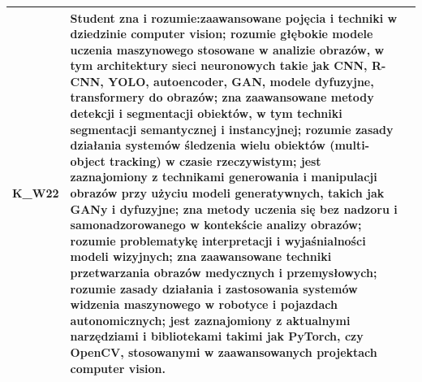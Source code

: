 \documentclass[12pt, a4paper]{article}
\begin{document}
{\begin{longtable}{m{1.6cm}m{9.0cm}m{4.2cm}}
  \rowcolor{tableRowLight} K\_W22 & Student zna i rozumie:zaawansowane pojęcia i techniki w dziedzinie computer vision; rozumie głębokie modele uczenia maszynowego stosowane w analizie obrazów, w tym architektury sieci neuronowych takie jak CNN, R-CNN, YOLO, autoencoder, GAN, modele dyfuzyjne, transformery do obrazów; zna zaawansowane metody detekcji i segmentacji obiektów, w tym techniki segmentacji semantycznej i instancyjnej; rozumie zasady działania systemów śledzenia wielu obiektów (multi-object tracking) w czasie rzeczywistym; jest zaznajomiony z technikami generowania i manipulacji obrazów przy użyciu modeli generatywnych, takich jak GANy i dyfuzyjne; zna metody uczenia się bez nadzoru i samonadzorowanego w kontekście analizy obrazów; rozumie problematykę interpretacji i wyjaśnialności modeli wizyjnych; zna zaawansowane techniki przetwarzania obrazów medycznych i przemysłowych; rozumie zasady działania i zastosowania systemów widzenia maszynowego w robotyce i pojazdach autonomicznych; jest zaznajomiony z aktualnymi narzędziami i bibliotekami takimi jak PyTorch, czy OpenCV, stosowanymi w zaawansowanych projektach computer vision. &  \\
\bottomrule
\end{longtable}}
\end{document}
